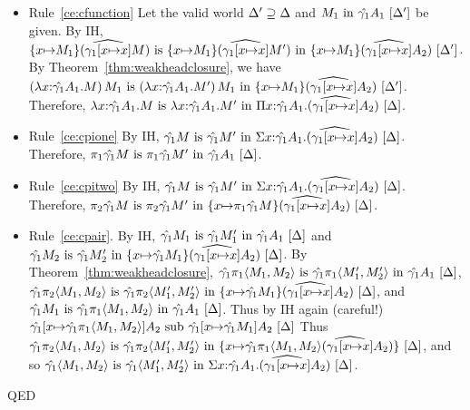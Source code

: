 \documentclass{article}
\theoremstyle{break}
\newcommand{\qed}{\mbox{QED}}
\newenvironment{proof}{\noindent{\bf Proof:}\hspace*{0.5em}}{\hspace*{\fill}\qed}
\begin{document}
\begin{proof}
\begin{itemize}
\item Rule~\ref{ce:cfunction}
Let the valid world $\world'\supseteq\world$ and 
$\semanticvalidterm{\world'}{\constructor_1}{\envone\kind_1}$ be given.
By IH, 
$\semanticequivterm{\world'}{\substitute{\cvar}{\constructor_1}{(\envonex\constructor)}}
    {\substitute{\cvar}{\constructor_1}{(\envonex\constructor')}}
    {\substitute{\cvar}{\constructor_1}{(\envonex\kind_2)}}$.
By Theorem~\ref{thm:weakheadclosure}, we have
$\semanticequivterm{\world'}{\capply{(\cfunction{\cvar}{\envone\kind_1}{\constructor})}{\constructor_1}}
    {\capply{(\cfunction{\cvar}{\envone\kind_1}{\constructor'})}{\constructor_1}}
    {\substitute{\cvar}{\constructor_1}{(\envonex\kind_2)}}$.
Therefore,
$\semanticequivterm{\world}{\cfunction{\cvar}{\envone\kind_1}{\constructor}}
    {\cfunction{\cvar}{\envone\kind_1}{\constructor'}}
    {\kpi{\cvar}{\envone\kind_1}{(\envonex\kind_2)}}$.

\item Rule~\ref{ce:cpione}
By IH,
$\semanticequivterm{\world}{\envone\constructor}{\envone\constructor'}
    {\ksigma{\cvar}{\envone\kind_1}{(\envonex\kind_2)}}$.
Therefore,
$\semanticequivterm{\world}{\cpi{1}{\envone\constructor}}{\cpi{1}{\envone\constructor'}}{\envone\kind_1}$.

\item Rule~\ref{ce:cpitwo}
By IH,
$\semanticequivterm{\world}{\envone\constructor}{\envone\constructor'}
    {\ksigma{\cvar}{\envone\kind_1}{(\envonex\kind_2)}}$.
Therefore,
$\semanticequivterm{\world}{\cpi{2}{\envone\constructor}}{\cpi{2}{\envone\constructor'}}
    {\substitute{\cvar}{\cpi{1}{\envone\constructor}}{(\envonex\kind_2)}}$.

\item Rule~\ref{ce:cpair}.
By IH,
$\semanticequivterm{\world}{\envone\constructor_1}{\envone\constructor'_1}{\envone\kind_1}$
and
$\semanticequivterm{\world}{\envone\constructor_2}{\envone\constructor'_2}
   {\substitute{\cvar}{\envone\constructor_1}{(\envonex\kind_2)}}$.
By Theorem~\ref{thm:weakheadclosure},
$\semanticequivterm{\world}{\envone\cpi{1}{\cpair{\constructor_1}{\constructor_2}}}
     {\envone\cpi{1}{\cpair{\constructor'_1}{\constructor'_2}}}{\envone\kind_1}$,
$\semanticequivterm{\world}{\envone\cpi{2}{\cpair{\constructor_1}{\constructor_2}}}
     {\envone\cpi{2}{\cpair{\constructor'_1}{\constructor'_2}}}
     {\substitute{\cvar}{\envone\constructor_1}{(\envonex\kind_2)}}$, and
$\semanticequivterm{\world}{\envone\constructor_1}{\envone\cpi{1}{\cpair{\constructor_1}{\constructor_2}}}
    {\envone\kind_1}$.
Thus by IH again (careful!)
$\semanticsubtype{\world}
   {\envone[\cvar{\mapsto}\envone\cpi{1}{\cpair{\constructor_1}{\constructor_2}}]\kind_2}
   {\envone[\cvar{\mapsto}\envone\constructor_1]\kind_2}$
Thus 
$\semanticequivterm{\world}{\envone\cpi{2}{\cpair{\constructor_1}{\constructor_2}}}
     {\envone\cpi{2}{\cpair{\constructor'_1}{\constructor'_2}}}
     {\substitute{\cvar}{\envone\cpi{1}{\cpair{\constructor_1}{\constructor_2}}{(\envonex\kind_2)}}}$,
and so
$\semanticequivterm{\world}
     {\envone\cpair{\constructor_1}{\constructor_2}}
     {\envone\cpair{\constructor'_1}{\constructor'_2}}
     {\ksigma{\cvar}{\envone\kind_1}{(\envonex\kind_2)}}$.


\end{itemize}
\end{proof}
\end{document}
